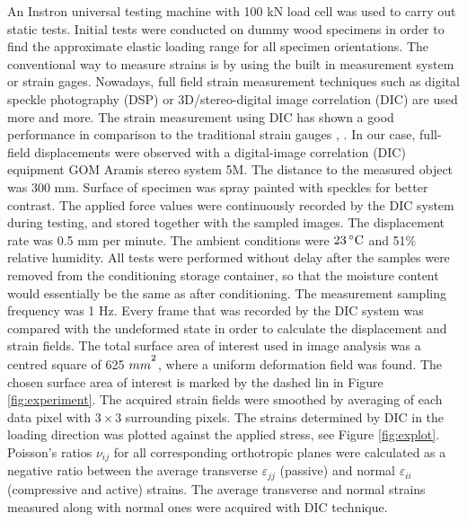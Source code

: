 \documentclass[review]{elsarticle}
\begin{document}
An Instron universal testing machine with 100 kN load cell was used to carry out static tests. 
Initial tests were conducted on dummy wood specimens in order to find the approximate elastic loading range for all specimen orientations.
The conventional way to measure strains is by using the built in measurement
system or strain gages. Nowadays, full field strain measurement techniques such
as digital speckle photography (DSP) \cite{synnergren1999stereoscopic} or
3D/stereo-digital image correlation (DIC) \cite{majano2012test} are used more
and more. The strain measurement using DIC has shown a good performance in
comparison to the traditional strain gauges \cite{huang2010optical},
\cite{xavier2012stereovision}. In our case, full-field displacements were observed with a digital-image correlation (DIC) equipment GOM Aramis stereo system 5M.
The distance to the measured object was 300 mm. Surface of specimen was spray
painted with speckles for better contrast. The applied force values were continuously recorded by the DIC system during testing, and stored together with the sampled images. The displacement rate was 0.5 mm per minute. 
The ambient conditions were $23\,^{\circ}{\rm C}$ and 51\% relative humidity.
All tests were performed without delay after the samples were removed from the conditioning storage container, so that the moisture content would essentially be the same as after conditioning. The measurement sampling frequency was 1 Hz. 
Every frame that was recorded by the DIC system was compared with the undeformed state in order to calculate the displacement and strain fields. 
The total surface area of interest used in image analysis was a centred square
of 625 $mm^\textsuperscript{2}$, where a uniform deformation field was found.
The chosen surface area of interest is marked by the dashed lin in Figure
\ref{fig:experiment}. The acquired strain fields were smoothed by averaging of
each data pixel with $3\times3$ surrounding pixels. The strains determined by
DIC in the loading direction was plotted against the applied stress, see Figure
\ref{fig:explot}.
Poisson's ratios $\nu_{ij}$ for all corresponding orthotropic planes were
calculated as a negative ratio between the average transverse $\varepsilon_{jj}$
(passive) and normal $\varepsilon_{ii}$ (compressive and active) strains.
The average transverse and normal strains measured along with normal ones were acquired with DIC technique.
\end{document}
